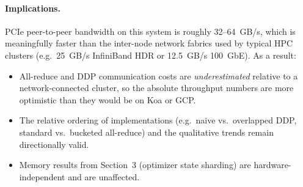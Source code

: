 \documentclass[letterpaper]{article}
\begin{document}
	\paragraph{Implications.}
	PCIe peer-to-peer bandwidth on this system is roughly 32--64~GB/s, which is meaningfully faster than the inter-node network fabrics used by typical HPC clusters (e.g.\ 25~GB/s InfiniBand HDR or 12.5~GB/s 100~GbE).
	As a result:
	\begin{itemize}
		\item All-reduce and DDP communication costs are \emph{underestimated} relative to a network-connected cluster, so the absolute throughput numbers are more optimistic than they would be on Koa or GCP.
		\item The relative ordering of implementations (e.g.\ naive vs.\ overlapped DDP, standard vs.\ bucketed all-reduce) and the qualitative trends remain directionally valid.
		\item Memory results from Section~3 (optimizer state sharding) are hardware-independent and are unaffected.
	\end{itemize}
	
\end{document}
